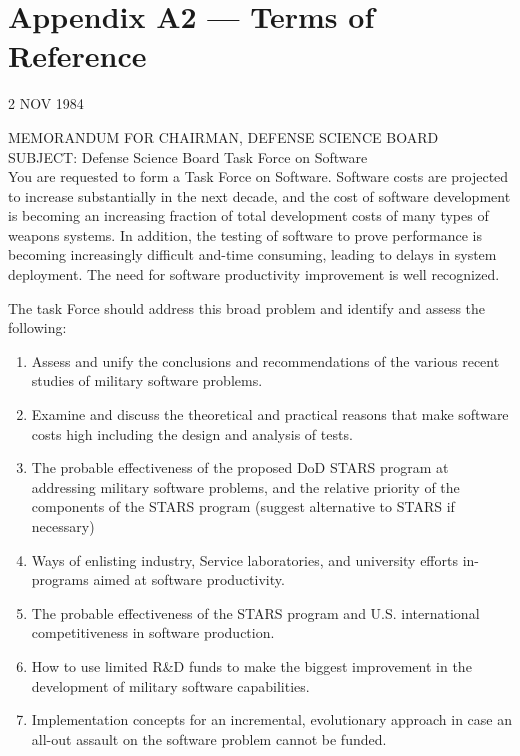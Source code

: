 \documentclass[12pt,final]{article}
\begin{document}
\newpage

\section*{Appendix A2 — Terms of Reference}
\begin{flushright}
    2 NOV 1984
\end{flushright}

\noindent
MEMORANDUM FOR CHAIRMAN, DEFENSE SCIENCE BOARD\\

\noindent
SUBJECT: Defense Science Board Task Force on Software\\

You are requested to form a Task Force on Software.  Software costs are
projected to increase substantially in the next decade, and the cost of
software development is becoming an increasing fraction of total development
costs of many types of weapons systems. In addition, the testing of software to
prove performance is becoming increasingly difficult and-time consuming,
leading to delays in system deployment. The need for software productivity
improvement is well recognized.

The task Force should address this broad problem and
identify and assess the following:

\renewcommand{\labelenumi}{\Alph{enumi}.}
\begin{enumerate}
    \item Assess and unify the conclusions and recommendations of the various
        recent studies of military software problems.
    \item Examine and discuss the theoretical and practical reasons that make
        software costs high including the design and analysis of tests.
    \item The probable effectiveness of the proposed DoD STARS program at
        addressing military software problems, and the relative priority of the
        components of the STARS program (suggest alternative to STARS if
        necessary)
    \item Ways of enlisting industry, Service laboratories, and university
        efforts in-programs aimed at software productivity.
    \item The probable effectiveness of the STARS program and U.S. international
        competitiveness in software production.
    \item How to use limited R\&D funds to make the biggest improvement in the
        development of military software capabilities.
    \item Implementation concepts for an incremental, evolutionary approach in
        case an all-out assault on the software problem cannot be funded.
\end{enumerate}
\end{document}
